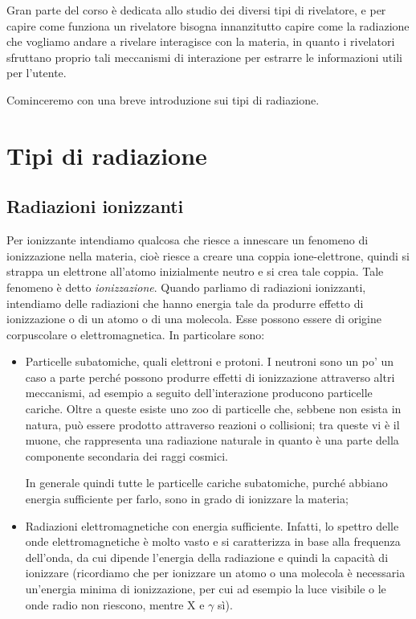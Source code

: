Gran parte del corso è dedicata allo studio dei diversi tipi di rivelatore, e per capire come funziona un rivelatore bisogna innanzitutto capire come la radiazione che vogliamo andare a rivelare interagisce con la materia, in quanto i rivelatori sfruttano proprio tali meccanismi di interazione per estrarre le informazioni utili per l'utente.

Cominceremo con una breve introduzione sui tipi di radiazione.

\section{Tipi di radiazione}

\subsection{Radiazioni ionizzanti}
Per ionizzante intendiamo qualcosa che riesce a innescare un fenomeno di ionizzazione nella materia, cioè riesce a creare una coppia ione-elettrone, quindi si strappa un elettrone all'atomo inizialmente neutro e si crea tale coppia. Tale fenomeno è detto \textit{ionizzazione}. Quando parliamo di radiazioni ionizzanti, intendiamo delle radiazioni che hanno energia tale da produrre effetto di ionizzazione o di un atomo o di una molecola. Esse possono essere di origine corpuscolare o elettromagnetica. In particolare sono:

\begin{itemize}[leftmargin=0.5cm]
    \item Particelle subatomiche, quali elettroni e protoni. I neutroni sono un po' un caso a parte perché possono produrre effetti di ionizzazione attraverso altri meccanismi, ad esempio a seguito dell'interazione producono particelle cariche. Oltre a queste esiste uno zoo di particelle che, sebbene non esista in natura, può essere prodotto attraverso reazioni o collisioni; tra queste vi è il muone, che rappresenta una radiazione naturale in quanto è una parte della componente secondaria dei raggi cosmici.
    
    In generale quindi tutte le particelle cariche subatomiche, purché abbiano energia sufficiente per farlo, sono in grado di ionizzare la materia;
    \item Radiazioni elettromagnetiche con energia sufficiente. Infatti, lo spettro delle onde elettromagnetiche è molto vasto e si caratterizza in base alla frequenza dell'onda, da cui dipende l'energia della radiazione e quindi la capacità di ionizzare (ricordiamo che per ionizzare un atomo o una molecola è necessaria un'energia minima di ionizzazione, per cui ad esempio la luce visibile o le onde radio non riescono, mentre X e $\gamma$ sì).
\end{itemize}

